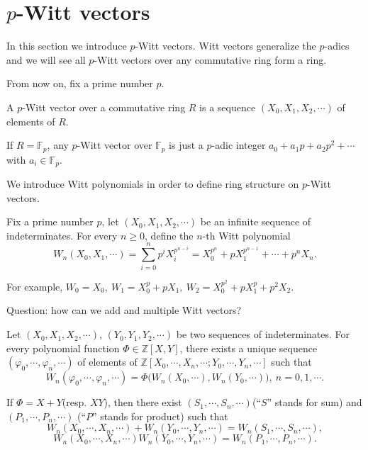 %
%
%
\section{$p$-Witt vectors} %
\label{sec:p_witt_vectors}
In this section we introduce $p$-Witt vectors. Witt vectors generalize the $p$-adics and we will see all $p$-Witt vectors over any commutative ring form a ring. 

From now on, fix a prime number $p$.
\begin{definition}
	A $p$-Witt vector over a commutative ring $R$ is a sequence $(X_0,X_1,X_2,\cdots)$ of elements of $R$.
\end{definition}
\begin{remark}
	If $R=\mathbb{F}_p$, any $p$-Witt vector over $\mathbb{F}_p$ is just a $p$-adic integer $a_0+a_1p+a_2p^2+\cdots$ with $a_i\in \mathbb{F}_p$.
\end{remark}
We introduce Witt polynomials in order to define ring structure on $p$-Witt vectors.
\begin{definition}
Fix a prime number $p$, let $(X_0,X_1,X_2,\cdots)$ be an infinite sequence of indeterminates. For every $n\geq 0$, define the $n$-th Witt polynomial
\[
	W_n(X_0,X_1,\cdots)=\sum_{i=0}^n p^iX_i^{p^{n-i}}=X_0^{p^n}+pX_1^{p^{n-1}}+\cdots+p^nX_n.
\]
\end{definition}
For example, $W_0=X_0,\ W_1=X_0^p+pX_1,\ W_2=X_0^{p^2}+pX_1^p+p^2X_2$.

Question: how can we add and multiple Witt vectors?
\begin{theorem}
Let $(X_0,X_1,X_2,\cdots)$, $(Y_0,Y_1,Y_2,\cdots)$ be two sequences of indeterminates. For every polynomial function $\Phi \in \mathbb{Z}[X,Y]$, there exists a unique sequence $(\varphi_0,\cdots, \varphi_n,\cdots)$ of elements of $\mathbb{Z}[X_0,\cdots,X_n,\cdots;Y_0,\cdots,Y_n,\cdots]$ such that
\[
 	W_n(\varphi_0,\cdots, \varphi_n,\cdots)=\Phi\big(W_n(X_0,\cdots),W_n(Y_0,\cdots)\big),\ n=0,1,\cdots.
 \] 
\end{theorem}
If $\Phi=X+Y$(resp. $XY$), then there exist $(S_1,\cdots,S_n,\cdots)$(``$S$'' stands for sum) and $(P_1,\cdots,P_n,\cdots)$ (``$P$'' stands for product) such that
\[W_n(X_0,\cdots,X_n,\cdots)+W_n(Y_0,\cdots,Y_n,\cdots)=W_n(S_1,\cdots,S_n,\cdots),\]
\[W_n(X_0,\cdots,X_n,\cdots)W_n(Y_0,\cdots,Y_n,\cdots)=W_n(P_1,\cdots,P_n,\cdots).\]


